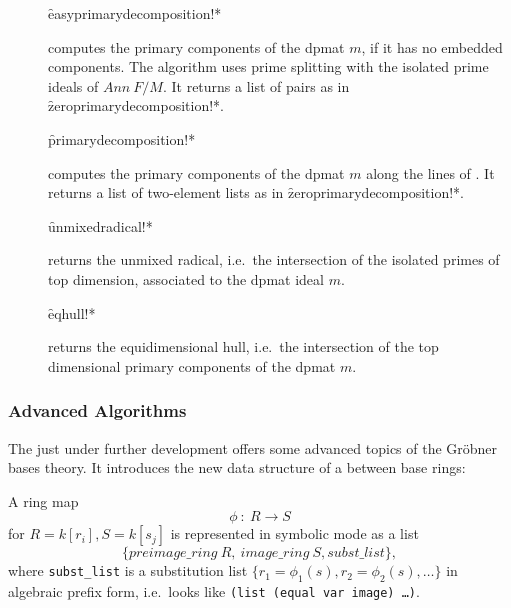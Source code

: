 \begin{description}
\item[]
  \begin{syntax}
    \f{easyprimarydecomposition!*} 
  \end{syntax}
  \hypertarget{procedure:EASYPRIMARYDECOMPOSITION!*}{}
computes the primary components of the dpmat $m$, if it has no
embedded components. The algorithm uses prime splitting with the
isolated prime ideals of $Ann\ F/M$. It returns a list of pairs as in
\f{zeroprimarydecomposition!*}.

\item[]
  \begin{syntax}
    \f{primarydecomposition!*} 
  \end{syntax}
  \hypertarget{procedure:PRIMARYDECOMPOSITION!*}{}
computes the primary components of the dpmat $m$ along the lines
  of \cite{Gianni:88}. It returns a list of two-element lists as in
  \f{zeroprimarydecomposition!*}.

\item[]
  \begin{syntax}
    \f{unmixedradical!*} 
  \end{syntax}
  \hypertarget{procedure:UNMIXEDRADICAL!*}{}
returns the unmixed radical, i.e.\ the intersection of the
isolated primes of top dimension, associated to the dpmat ideal $m$.

\item[]
  \begin{syntax}
    \f{eqhull!*} 
  \end{syntax}
  \hypertarget{procedure:EQHULL!*}{}
returns the equidimensional hull, i.e.\ the intersection of the
 top dimensional primary components of the dpmat $m$.
\end{description}

\subsubsection{Advanced Algorithms}

The  just under further development offers some
advanced topics of the Gr\"obner bases theory. It introduces the new data
structure of a  between base rings:
\medskip

A ring map
\[ \phi\ :\ R\longrightarrow S\]
for $R=k[r_i], S=k[s_j]$ is represented in symbolic mode as a list
\[   \{preimage\_ring\ R,\ image\_ring\ S, subst\_list\},\]
where \texttt{subst\_list} is a substitution list $\{r_1=\phi_1(s),
r_2=\phi_2(s),\ldots \}$ in algebraic prefix form, i.e.\ looks like
\texttt{(list (equal var image) \ldots )}.

